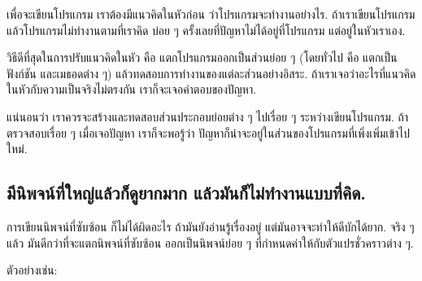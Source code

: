 เพื่อจะเขียนโปรแกรม
เราต้องมีแนวคิดในหัวก่อน
ว่าโปรแกรมจะทำงานอย่างไร.
ถ้าเราเขียนโปรแกรม
แล้วโปรแกรมไม่ทำงานตามที่เราคิด
บ่อย ๆ ครั้งเลยที่ปัญหาไม่ได้อยู่ที่โปรแกรม
แต่อยู่ในหัวเราเอง.



วิธีดีที่สุดในการปรับแนวคิดในหัว
คือ แตกโปรแกรมออกเป็นส่วนย่อย ๆ (โดยทั่วไป คือ 
แตกเป็นฟังก์ชัน และเมธอดต่าง ๆ)
แล้วทดสอบการทำงานของแต่ละส่วนอย่างอิสระ.
ถ้าเราเจอว่าอะไรที่แนวคิดในหัวกับความเป็นจริงไม่ตรงกัน
เราก็จะเจอคำตอบของปัญหา.


แน่นอนว่า เราควรจะสร้างและทดสอบส่วนประกอบย่อยต่าง ๆ ไปเรื่อย ๆ ระหว่างเขียนโปรแกรม.
ถ้าตรวจสอบเรื่อย ๆ 
เมื่อเจอปัญหา
เราก็จะพอรู้ว่า ปัญหาก็น่าจะอยู่ในส่วนของโปรแกรมที่เพิ่งเพิ่มเข้าไปใหม่.


\subsection{มีนิพจน์ที่ใหญ่แล้วก็ดูยากมาก
แล้วมันก็ไม่ทำงานแบบที่คิด.}



การเขียนนิพจน์ที่ซับซ้อน ก็ไม่ได้ผิดอะไร ถ้ามันยังอ่านรู้เรื่องอยู่
แต่มันอาจจะทำให้ดีบักได้ยาก.
จริง ๆ แล้ว มันดีกว่าที่จะแตกนิพจน์ที่ซับซ้อน
ออกเป็นนิพจน์ย่อย ๆ ที่กำหนดค่าให้กับตัวแปรชั่วคราวต่าง ๆ.


ตัวอย่างเช่น:

